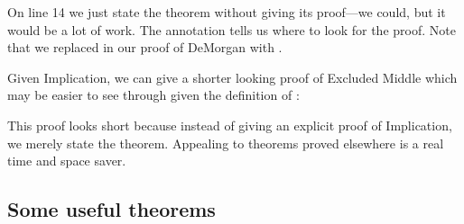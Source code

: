 \begin{argumentN}[12]












\end{argumentN}


On line 14 we just state the theorem without giving its proof---we could, but it 
would be a lot of work. The annotation tells us where to look for the proof.  
Note that we replaced  in our proof of DeMorgan with .


Given Implication, we can give a shorter looking  proof of Excluded Middle which 
may be easier to see through given the definition of \p{\limplies}:

\begin{argumentN}[23]




\end{argumentN}




This proof looks short because instead of giving an explicit proof of 
Implication, we merely state the theorem. Appealing to theorems proved elsewhere 
is a real time and space saver.

\subsection{Some useful theorems}

